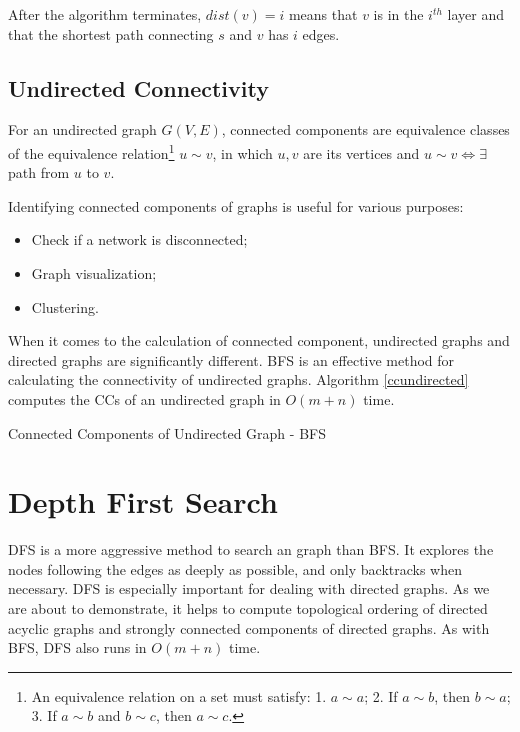 After the algorithm terminates, $dist(v)=i$ means that $v$ is in the $i^{th}$ layer and that the shortest path connecting $s$ and $v$ has $i$ edges.
\subsection{Undirected Connectivity}
\begin{definition}
For an undirected graph $G(V,E)$, connected components are equivalence classes of the equivalence relation\footnote{An equivalence relation on a set must satisfy: 1. $a\sim a$; 2. If $a\sim b$, then $b\sim a$; 3. If $a\sim b$ and $b\sim c$, then $a\sim c$.} $u\sim v$, in which $u,v$ are its vertices and $u\sim v\iff\exists$ path from $u$ to $v$. 
\end{definition} 

Identifying connected components of graphs is useful for various purposes:
\begin{itemize}
\item Check if a network is disconnected;
\item Graph visualization;
\item Clustering.
\end{itemize}
When it comes to the calculation of connected component, undirected graphs and directed graphs are significantly different. BFS is an effective method for calculating the connectivity of undirected graphs. Algorithm \ref{ccundirected} computes the CCs of an undirected graph in $O(m+n)$ time.
\begin{algorithm}[ht]
\caption{Connected Components of Undirected Graph - BFS}\label{ccundirected}
\begin{algorithmic}[1]
\Input{}
\Output{}
\EndIf
\EndFor
\end{algorithmic}
\end{algorithm}
\section{Depth First Search}
DFS is a more aggressive method to search an graph than BFS. It explores the nodes following the edges as deeply as possible, and only backtracks when necessary. DFS is especially important for dealing with directed graphs. As we are about to demonstrate, it helps to compute topological ordering of directed acyclic graphs and strongly connected components of directed graphs. As with BFS, DFS also runs in $O(m+n)$ time. 

